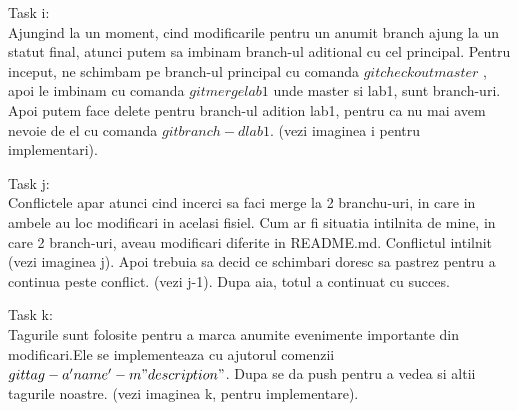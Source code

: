 \par Task i:\\
Ajungind la un moment, cind modificarile pentru un anumit branch ajung la un statut final, atunci putem sa imbinam branch-ul aditional cu cel principal. Pentru inceput, ne schimbam pe branch-ul principal cu comanda $ git checkout master $ , apoi le imbinam cu comanda $ git merge lab1 $ unde master si lab1, sunt branch-uri. Apoi putem face delete pentru branch-ul adition lab1, pentru ca nu mai avem nevoie de el cu comanda $ git branch -d lab1 $. (vezi imaginea i pentru implementari).
\par Task j:\\
Conflictele apar atunci cind incerci sa faci merge la 2 branchu-uri, in care in ambele au loc modificari in acelasi fisiel. Cum ar fi situatia intilnita de mine, in care 2 branch-uri, aveau modificari diferite in README.md. Conflictul intilnit (vezi imaginea j). Apoi trebuia sa decid ce schimbari doresc sa pastrez pentru a continua peste conflict. (vezi j-1). Dupa aia, totul a continuat cu succes.
\par Task k:\\
Tagurile sunt folosite pentru a marca anumite evenimente importante din modificari.Ele se implementeaza cu ajutorul comenzii $ git tag -a 'name' -m "description" $. 
Dupa se da push pentru a vedea si altii tagurile noastre. (vezi imaginea k, pentru implementare). 
\clearpage

